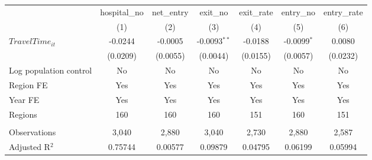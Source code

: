\begingroup
\centering
\begin{tabular}{lcccccc}
   \toprule
                          & hospital\_no  & net\_entry  & exit\_no       & exit\_rate  & entry\_no     & entry\_rate \\    
                          & (1)           & (2)         & (3)            & (4)         & (5)           & (6)\\  
   \midrule 
   $TravelTime_{it}$      & -0.0244       & -0.0005     & -0.0093$^{**}$ & -0.0188     & -0.0099$^{*}$ & 0.0080\\   
                          & (0.0209)      & (0.0055)    & (0.0044)       & (0.0155)    & (0.0057)      & (0.0232)\\   
   Log population control & No            & No          & No             & No          & No            & No\\  
   Region FE              & Yes           & Yes         & Yes            & Yes         & Yes           & Yes\\  
   Year FE                & Yes           & Yes         & Yes            & Yes         & Yes           & Yes\\  
   Regions                & 160           & 160         & 160            & 151         & 160           & 151\\  
    \\
   Observations           & 3,040         & 2,880       & 3,040          & 2,730       & 2,880         & 2,587\\  
   Adjusted R$^2$         & 0.75744       & 0.00577     & 0.09879        & 0.04795     & 0.06199       & 0.05994\\  
   \bottomrule
\end{tabular}
\par\endgroup
